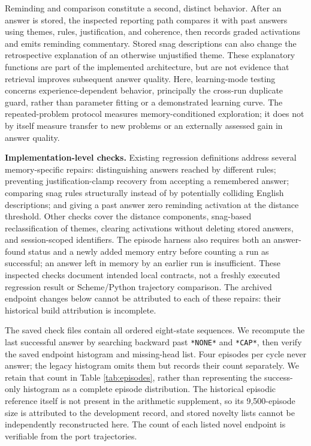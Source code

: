 \documentclass[10pt,letterpaper]{article}
\begin{document}
Reminding and comparison constitute a second, distinct behavior. After an answer is
stored, the inspected reporting path compares it with past answers using themes, rules,
justification, and coherence, then records graded activations and emits reminding
commentary. Stored snag descriptions can also change the retrospective explanation of an
otherwise unjustified theme. These explanatory functions are part of the implemented
architecture, but are not evidence that retrieval improves subsequent answer quality.
Here, learning-mode testing concerns experience-dependent behavior, principally the
cross-run duplicate guard, rather than parameter fitting or a demonstrated learning curve.
The repeated-problem protocol measures memory-conditioned exploration; it does not by
itself measure transfer to new problems or an externally assessed gain in answer quality.

\textbf{Implementation-level checks.} Existing regression definitions address several
memory-specific repairs: distinguishing answers reached by different rules; preventing
justification-clamp recovery from accepting a remembered answer; comparing snag rules
structurally instead of by potentially colliding English descriptions; and giving a past
answer zero reminding activation at the distance threshold. Other checks cover the
distance components, snag-based reclassification of themes, clearing activations without
deleting stored answers, and session-scoped identifiers. The episode harness also requires
both an answer-found status and a newly added memory entry before counting a run as
successful; an answer left in memory by an earlier run is insufficient. These inspected
checks document intended local contracts, not a freshly executed regression result or
Scheme/Python trajectory comparison. The archived endpoint changes below cannot be
attributed to each of these repairs: their historical build attribution is incomplete.

The saved check files contain all ordered eight-state sequences. We recompute the last
successful answer by searching backward past \texttt{*NONE*} and \texttt{*CAP*}, then
verify the saved endpoint histogram and missing-head list. Four episodes per cycle never
answer; the legacy histogram omits them but records their count separately. We retain that
count in Table \ref{tab:episodes}, rather than representing the success-only histogram as
a complete episode distribution. The historical episodic reference itself is not present
in the arithmetic supplement, so its 9,500-episode size is attributed to the development
record, and stored novelty lists cannot be independently reconstructed here. The count of
each listed novel endpoint is verifiable from the port trajectories.
\end{document}
